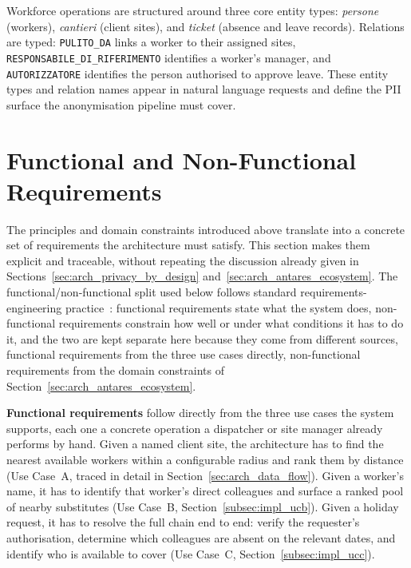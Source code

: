 Workforce operations are structured around three core entity types: \emph{persone} (workers), \emph{cantieri} (client sites), and \emph{ticket} (absence and leave records). Relations are typed: \texttt{PULITO\_DA} links a worker to their assigned sites, \texttt{RESPONSABILE\_DI\_RIFERIMENTO} identifies a worker's manager, and \texttt{AUTORIZZATORE} identifies the person authorised to approve leave. These entity types and relation names appear in natural language requests and define the PII surface the anonymisation pipeline must cover.

\section{Functional and Non-Functional Requirements}
\label{sec:arch_requirements}

The principles and domain constraints introduced above translate into a concrete set of requirements the architecture must satisfy. This section makes them explicit and traceable, without repeating the discussion already given in Sections~\ref{sec:arch_privacy_by_design} and~\ref{sec:arch_antares_ecosystem}. The functional/non-functional split used below follows standard requirements-engineering practice~\cite{sommerville2015engineering}: functional requirements state what the system does, non-functional requirements constrain how well or under what conditions it has to do it, and the two are kept separate here because they come from different sources, functional requirements from the three use cases directly, non-functional requirements from the domain constraints of Section~\ref{sec:arch_antares_ecosystem}.

\textbf{Functional requirements} follow directly from the three use cases the system supports, each one a concrete operation a dispatcher or site manager already performs by hand. Given a named client site, the architecture has to find the nearest available workers within a configurable radius and rank them by distance (Use Case~A, traced in detail in Section~\ref{sec:arch_data_flow}). Given a worker's name, it has to identify that worker's direct colleagues and surface a ranked pool of nearby substitutes (Use Case~B, Section~\ref{subsec:impl_ucb}). Given a holiday request, it has to resolve the full chain end to end: verify the requester's authorisation, determine which colleagues are absent on the relevant dates, and identify who is available to cover (Use Case~C, Section~\ref{subsec:impl_ucc}).

